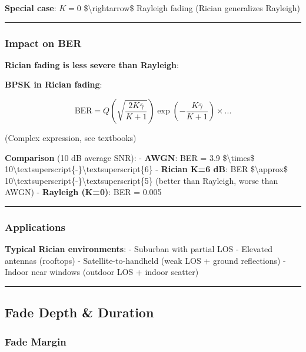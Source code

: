 \textbf{Special case}: \(K = 0\) \$\textbackslash rightarrow\$ Rayleigh
fading (Rician generalizes Rayleigh)

\begin{center}\rule{0.5\linewidth}{0.5pt}\end{center}

\subsubsection{Impact on BER}\label{impact-on-ber-1}

\textbf{Rician fading is less severe than Rayleigh}:

\textbf{BPSK in Rician fading}:

\[
\text{BER} = Q\left(\sqrt{\frac{2K\bar{\gamma}}{K+1}}\right) \exp\left(-\frac{K\bar{\gamma}}{K+1}\right) \times ...
\]

(Complex expression, see textbooks)

\textbf{Comparison} (10 dB average SNR): - \textbf{AWGN}: BER = 3.9
\$\textbackslash times\$
10\textbackslash textsuperscript\{-\}\textbackslash textsuperscript\{6\}
- \textbf{Rician K=6 dB}: BER \$\textbackslash approx\$
10\textbackslash textsuperscript\{-\}\textbackslash textsuperscript\{5\}
(better than Rayleigh, worse than AWGN) - \textbf{Rayleigh (K=0)}: BER =
0.005

\begin{center}\rule{0.5\linewidth}{0.5pt}\end{center}

\subsubsection{Applications}\label{applications-1}

\textbf{Typical Rician environments}: - Suburban with partial LOS -
Elevated antennas (rooftops) - Satellite-to-handheld (weak LOS + ground
reflections) - Indoor near windows (outdoor LOS + indoor scatter)

\begin{center}\rule{0.5\linewidth}{0.5pt}\end{center}

\subsection{Fade Depth \& Duration}\label{fade-depth-duration}

\subsubsection{Fade Margin}\label{fade-margin}

